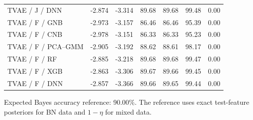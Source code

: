 \documentclass[11pt,letterpaper]{article}
\begin{document}
\begin{table}[H]
\begin{tabular}{lrrrrrr}
TVAE / J / DNN & -2.874 & -3.314 & 89.68 & 89.68 & 99.48 & 0.00\\
TVAE / F / GNB & -2.973 & -3.157 & 86.46 & 86.46 & 95.39 & 0.00\\
TVAE / F / CNB & -2.978 & -3.151 & 86.33 & 86.33 & 95.23 & 0.00\\
TVAE / F / PCA--GMM & -2.905 & -3.192 & 88.62 & 88.61 & 98.17 & 0.00\\
TVAE / F / RF & -2.885 & -3.218 & 89.68 & 89.68 & 99.47 & 0.00\\
TVAE / F / XGB & -2.863 & -3.306 & 89.67 & 89.66 & 99.45 & 0.00\\
TVAE / F / DNN & -2.857 & -3.366 & 89.66 & 89.65 & 99.44 & 0.00\\
\bottomrule\end{tabular}
\end{table}
Expected Bayes accuracy reference: 90.00\%. The reference uses exact test-feature posteriors for BN data and $1-\eta$ for mixed data.
\clearpage
\end{document}
